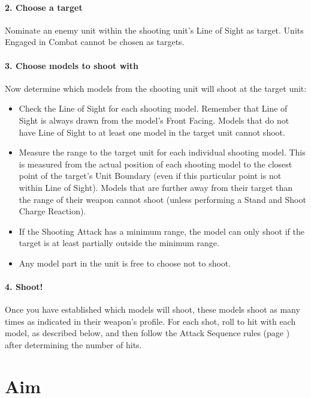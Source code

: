 \paragraph{2. Choose a target}

Nominate an enemy unit within the shooting unit's Line of Sight as target. Units Engaged in Combat cannot be chosen as targets.

\paragraph{3. Choose models to shoot with}

Now determine which models from the shooting unit will shoot at the target unit:
\begin{itemize}
\item Check the Line of Sight for each shooting model. Remember that Line of Sight is always drawn from the model's Front Facing. Models that do not have Line of Sight to at least one model in the target unit cannot shoot.
\item Measure the range to the target unit for each individual shooting model. This is measured from the actual position of each shooting model to the closest point of the target's Unit Boundary (even if this particular point is not within Line of Sight). Models that are further away from their target than the range of their weapon cannot shoot (unless performing a Stand and Shoot Charge Reaction).
\item If the Shooting Attack has a minimum range, the model can only shoot if the target is at least partially outside the minimum range.
\item Any model part in the unit is free to choose not to shoot.
\end{itemize}

\paragraph{4. Shoot!}

Once you have established which models will shoot, these models shoot as many times as indicated in their weapon's profile. For each shot, roll to hit with each model, as described below, and then follow the Attack Sequence rules (page \pageref{attack_sequence}) after determining the number of hits.

\section{Aim}
\label{aim}

